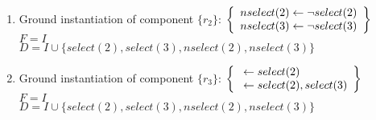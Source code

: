 \begin{Loesung}
\begin{UList}
\begin{description}
{\begin{enumerate}
  $D = I \cup \{ select(2), select(3) \}$
  \item Ground instantiation of component $\{r_2\}$:
  \( \left\{
  \begin{array}{r@{}c@{}l}
    nselect(2) & {} \leftarrow {} & \naf{select(2)} \\
    nselect(3) & {} \leftarrow {} & \naf{select(3)}
  \end{array}
  \right\}
  \)
  \\
  $F = I$ 
  \\ 
  $D = I \cup \{ select(2), select(3), nselect(2), nselect(3) \}$
  \item Ground instantiation of component $\{r_3\}$:
  \( \left\{
  \begin{array}{r@{}c@{}l}
    & {} \leftarrow {} & select(2) \\
    & {} \leftarrow {} & select(2), select(3)
  \end{array}
  \right\}
  \)
  \\
  $F = I$ 
  \\ 
  $D = I \cup \{ select(2), select(3), nselect(2), nselect(3) \}$
\end{enumerate}
}
%
\end{description}
%
\item 
{}
\end{UList}
\end{Loesung}
